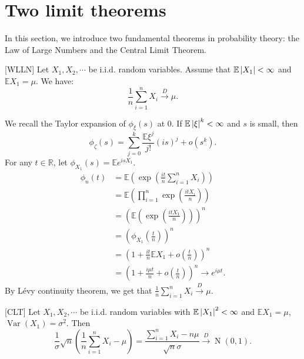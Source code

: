 \documentclass{huhtakm-template-book-v2}
\newcommand{\expect}{\mathbb{E}}
\DeclareMathOperator{\N}{N}
\DeclareMathOperator{\Var}{Var}
\begin{document}
\section{Two limit theorems}
    In this section, we introduce two fundamental theorems in probability theory: the Law of Large Numbers and the Central Limit Theorem.
    \begin{thm} [WLLN]
        Let $X_{1},X_{2},\cdots$ be i.i.d. random variables. Assume that $\expect\abs{X_{1}} < \infty$ and $\expect{X_{1}} = \mu$. We have:
        \begin{equation*}
            \frac{1}{n}\sum_{i = 1}^{n}X_{i} \xrightarrow{D} \mu.
        \end{equation*}
    \end{thm}
    \begin{proofing}
        We recall the Taylor expansion of $\phi_{\xi}(s)$ at $0$. If $\expect\abs{\xi}^{k} < \infty$ and $s$ is small, then
        \begin{equation*}
            \phi_{\zeta}(s) = \sum_{j = 0}^{k}\frac{\expect{\xi^{j}}}{j!}(is)^{j}+o(s^{k}).
        \end{equation*}
        For any $t \in \mathbb{R}$, let $\phi_{X_{1}}(s) = \expect{e^{isX_{1}}}$.
        \begin{align*}
            \phi_{n}(t) &= \expect\left(\exp\left(\frac{it}{n}\sum_{i = 1}^{n}X_{i}\right)\right)\\
            &= \expect\left(\prod_{i = 1}^{n}\exp\left(\frac{itX_{i}}{n}\right)\right)\\
            &= \left(\expect\left(\exp\left(\frac{itX_{1}}{n}\right)\right)\right)^{n}\\
            &= \left(\phi_{X_{1}}\left(\frac{t}{n}\right)\right)^{n}\\
            &= \left(1+\frac{it}{n}\expect{X_{1}}+o\left(\frac{t}{n}\right)\right)^{n}\\
            &= \left(1+\frac{i\mu t}{n}+o\left(\frac{t}{n}\right)\right)^{n} \to e^{i\mu t}.
        \end{align*}
        By L\'evy continuity theorem, we get that $\frac{1}{n}\sum_{i = 1}^{n}X_{i} \xrightarrow{D} \mu$.
    \end{proofing}
    \begin{thm} [CLT]
        Let $X_{1},X_{2},\cdots$ be i.i.d. random variables with $\expect\abs{X_{1}}^{2} < \infty$ and $\expect{X_{1}} = \mu$, $\Var(X_{1}) = \sigma^{2}$. Then
        \begin{equation*}
            \frac{1}{\sigma}\sqrt{n}\left(\frac{1}{n}\sum_{i = 1}^{n}X_{i}-\mu\right) = \frac{\sum_{i = 1}^{n}X_{i}-n\mu}{\sqrt{n}\sigma} \xrightarrow{D} \N(0,1).
        \end{equation*}
    \end{thm}
\end{document}
